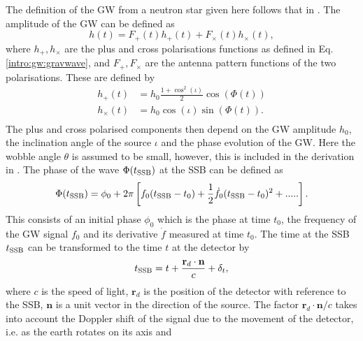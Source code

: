 The definition of the \gls{GW} from a neutron star given here follows that in
\citep{riles2017RecentSearches,schutz1998DataAnalysis,dupuis2005BayesianEstimation}.
The amplitude of the \gls{GW} can be defined as
%
\begin{equation}
\label{intro:cw:ht}
h(t) = F_+(t)h_{+}(t) +F_{\times}(t)h_{\times}(t),
\end{equation}
%
where $h_{+},h_{\times}$ are the plus and cross polarisations functions as defined in
Eq.\ref{intro:gw:gravwave}, and $F_{+},F_{\times}$ are the antenna pattern
functions of the two polarisations. These are defined by
%
\begin{equation}
\label{intro:cw:amplitudes}
    \begin{split}
        h_{+}(t) &=  h_0 \frac{1 + \cos^2{(\iota)}}{2}\cos{\left(\Phi(t)\right)} \\
        h_{\times}(t) &= h_0  \cos{(\iota)} \sin{\left( \Phi(t)\right) }. \\
    \end{split}
\end{equation}
%
The plus and cross polarised components then depend on the \gls{GW} amplitude
$h_0$, the inclination angle of the source $\iota$ and the phase evolution of
the \gls{GW}. Here the wobble angle $\theta$ is assumed to be small,
however, this is included in the derivation in \citep{schutz1998DataAnalysis}.
The phase of the wave $\Phi(t_{{\rm SSB}})$ at the \gls{SSB} can be defined as
%
\begin{equation}
\label{searchcw:model:phase}
    \Phi(t_{{\rm SSB}}) = \phi_0 + 2\pi\left[ f_0(t_{{\rm SSB}} - t_0) + \frac{1}{2} \dot{f_0} (t_{{\rm SSB}} - t_0)^2 + .....\right] .
\end{equation}
%
This consists of an initial phase $\phi_0$ which is the phase at time $t_0$,
the frequency of the \gls{GW} signal $f_0$ and its derivative ${\dot{f}}$ measured at
time $t_0$. The time at the \gls{SSB} $t_{{\rm SSB}}$ can be
transformed to the time $t$ at the detector by
%
\begin{equation}
	\label{searchcw:model:ssbtime}
t_{{\rm SSB}} = t + \frac{\mathbf{r}_d \cdot \mathbf{n}}{c} + \delta_t,
\end{equation}
%
where $c$ is the speed of light, $\mathbf{r}_d$ is the position of the detector with reference to the
\gls{SSB}, $\mathbf{n}$ is a unit vector in the direction of the source. The factor $\mathbf{r}_d \cdot \mathbf{n}/c$ takes into account the Doppler shift of the
signal due to the movement of the detector, i.e. as the earth rotates on its axis and
